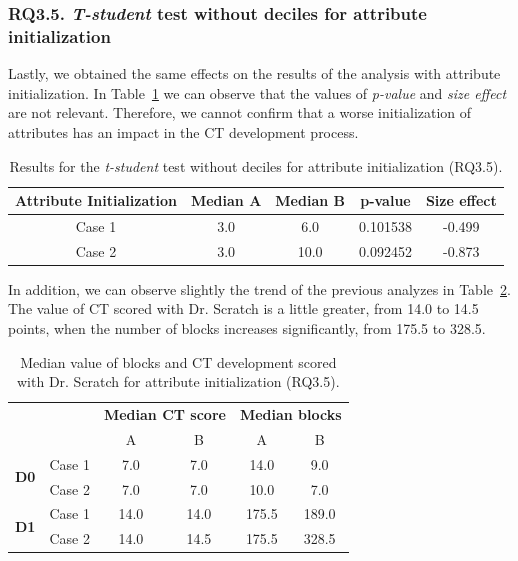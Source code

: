 \subsubsection{RQ3.5. \textit{T-student} test without deciles for attribute initialization}
\label{subsubsec:RQ3_5_statistical_results}

Lastly, we obtained the same effects on the results of the analysis with attribute initialization. In Table~\ref{table:rq3_5_statistical_results} we can observe that the values of \textit{p-value} and \textit{size effect} are not relevant. Therefore, we cannot confirm that a worse initialization of attributes has an impact in the CT development process. 

\begin{table}
 \begin{center}
  \begin{tabular}{|c|c|c|c|c|}
    \hline
    \textbf{Attribute Initialization} & \textbf{Median A} & \textbf{Median B} & \textbf{p-value} & \textbf{Size effect} \\ \hline
    Case 1 & 3.0 & 6.0 & 0.101538 & -0.499 \\ \hline
    Case 2 & 3.0 & 10.0 & 0.092452 & -0.873 \\ \hline
  \end{tabular}
  \caption{Results for the \textit{t-student} test without deciles for attribute initialization (RQ3.5).}
  \label{table:rq3_5_statistical_results}
 \end{center}
\end{table}

In addition, we can observe slightly the trend of the previous analyzes in Table~\ref{table:rq3_5_statistical_results_median}. The value of CT scored with Dr. Scratch is a little greater, from 14.0 to 14.5 points, when the number of blocks increases significantly, from 175.5 to 328.5.

\begin{table}
 \begin{center}
  \begin{tabular}{|c|c|c|c|c|c|}
    \cline{3-6}
     \multicolumn{2}{c}{} & 
     \multicolumn{2}{|c|}{\textbf{Median CT score}} & \multicolumn{2}{|c|}{\textbf{Median blocks}} \\ 
     \cline{3-6}
     \multicolumn{2}{c|}{} & A & B & A & B \\ \hline
     \multirow{2}{*}{\textbf{D0}}
     & Case 1 & 7.0 & 7.0 & 14.0 & 9.0 \\
     & Case 2 & 7.0 & 7.0 & 10.0 & 7.0 \\ \hline
     \multirow{2}{*}{\textbf{D1}}
     & Case 1 & 14.0 & 14.0 & 175.5 & 189.0 \\
     & Case 2 & 14.0 & 14.5 & 175.5 & 328.5 \\ \hline
  \end{tabular}
  \caption{Median value of blocks and CT development scored with Dr. Scratch for attribute initialization (RQ3.5).}
  \label{table:rq3_5_statistical_results_median}
 \end{center}
\end{table}

